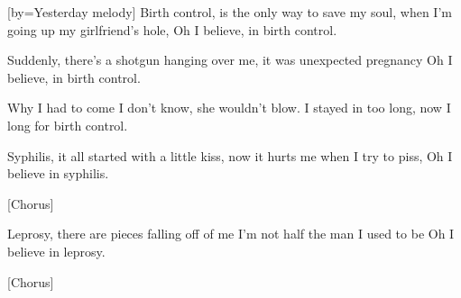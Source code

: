 [by={Yesterday melody}]
\beginverse
Birth control, is the only way to save my soul,
when I'm going up my girlfriend's hole,
Oh I believe, in birth control.
\endverse

\beginverse
Suddenly, there's a shotgun hanging over me,
it was unexpected pregnancy
Oh I believe, in birth control.
\endverse

\beginchorus
Why I had to come I don't know, she wouldn't blow.
I stayed in too long, now I long for birth control.
\endchorus

\beginverse
Syphilis, it all started with a little kiss,
now it hurts me when I try to piss,
Oh I believe in syphilis.
\endverse

[Chorus]

\beginverse
Leprosy, there are pieces falling off of me
I'm not half the man I used to be
Oh I believe in leprosy.
\endverse

[Chorus]
\endsong
